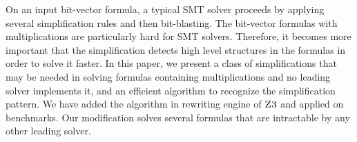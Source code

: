 %
On an input bit-vector formula,
a typical SMT solver proceeds by applying several
simplification rules and then bit-blasting.
%
The bit-vector formulas with multiplications
are particularly hard for SMT solvers.
%
Therefore, it becomes more important that the simplification detects
high level structures in the formulas in order to solve it faster.
%
In this paper, we present a class of simplifications that may be
needed in solving formulas containing multiplications and no leading
solver implements it, and an efficient algorithm to recognize the
simplification pattern. 
%
We have added the algorithm in rewriting engine of $\textsc{Z3}$
and applied on benchmarks.
%
Our modification solves several formulas that are
intractable by any other leading solver.
%


